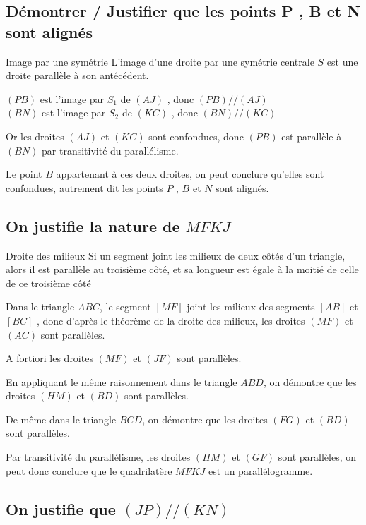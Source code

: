 \documentclass[oneside,12pt]{article}          %
\begin{document}
\subsection{Démontrer / Justifier que les points P , B et N sont alignés}

\begin{propriete}{Image par une symétrie}
	L'image d'une droite par une symétrie centrale $S$ est une droite parallèle à son antécédent.
\end{propriete}

$(PB)$ est l'image par $S_1$ de $(AJ)$ , donc $(PB) // (AJ)$ \\
$(BN)$ est l'image par $S_2$ de $(KC)$ , donc $(BN) // (KC)$

Or les droites $(AJ)$ et $(KC)$ sont confondues, donc $(PB)$ est parallèle à $(BN)$ par transitivité du parallélisme.

Le point $B$ appartenant à ces deux droites, on peut conclure qu'elles sont confondues, autrement dit les points $P$ , $B$ et $N$ sont alignés.



\subsection{On justifie la nature de $MFKJ$}

\begin{theoreme}{Droite des milieux}
	Si un segment joint les milieux de deux côtés d’un triangle, alors il est parallèle au troisième côté, et sa longueur est égale à la moitié de celle de ce troisième côté
\end{theoreme}

Dans le triangle $ABC$, le segment $[MF]$ joint les milieux des segments $[AB]$ et $[BC]$ , donc d'après le théorème de la droite des milieux, les droites $(MF)$ et $(AC)$ sont parallèles.

A fortiori les droites $(MF)$ et $(JF)$ sont parallèles.

En appliquant le même raisonnement dans le triangle $ABD$, on démontre que les droites $(HM)$ et $(BD)$ sont parallèles.

De même dans le triangle $BCD$, on démontre que les droites $(FG)$ et $(BD)$ sont parallèles.

Par transitivité du parallélisme, les droites $(HM)$ et $(GF)$ sont parallèles, on peut donc conclure que le quadrilatère $MFKJ$ est un parallélogramme.



\subsection{On justifie que $(JP) // (KN)$}
\end{document}
